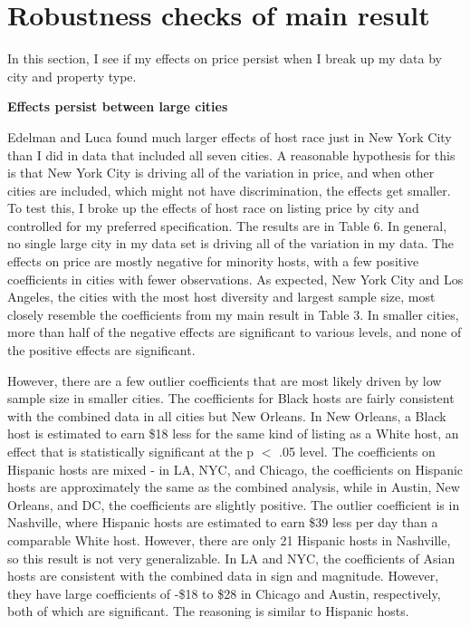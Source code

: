 \documentclass[11pt, oneside]{article}
\begin{document}
\section{Robustness checks of main result} %

In this section, I see if my effects on price persist when I break up my data by city and property type. 

\textbf{Effects persist between large cities}

Edelman and Luca found much larger effects of host race just in New York City than I did in data that included all seven cities. A reasonable hypothesis for this is that New York City is driving all of the variation in price, and when other cities are included, which might not have discrimination, the effects get smaller. To test this, I broke up the effects of host race on listing price by city and controlled for my preferred specification. The results are in Table 6. In general, no single large city in my data set is driving all of the variation in my data. The effects on price are mostly negative for minority hosts, with a few positive coefficients in cities with fewer observations. As expected, New York City and Los Angeles, the cities with the most host diversity and largest sample size, most closely resemble the coefficients from my main result in Table 3. In smaller cities, more than half of the negative effects are significant to various levels, and none of the positive effects are significant. 

However, there are a few outlier coefficients that are most likely driven by low sample size in smaller cities. The coefficients for Black hosts are fairly consistent with the combined data in all cities but New Orleans. In New Orleans, a Black host is estimated to earn \$18 less for the same kind of listing as a White host, an effect that is statistically significant at the p $<$ .05 level. The coefficients on Hispanic hosts are mixed - in LA, NYC, and Chicago, the coefficients on Hispanic hosts are approximately the same as the combined analysis, while in Austin, New Orleans, and DC, the coefficients are slightly positive. The outlier coefficient is in Nashville, where Hispanic hosts are estimated to earn \$39 less per day than a comparable White host. However, there are only 21 Hispanic hosts in Nashville, so this result is not very generalizable. In LA and NYC, the coefficients of Asian hosts are consistent with the combined data in sign and magnitude. However, they have large coefficients of -\$18 to \$28 in Chicago and Austin, respectively, both of which are significant. The reasoning is similar to Hispanic hosts. 
\end{document}
